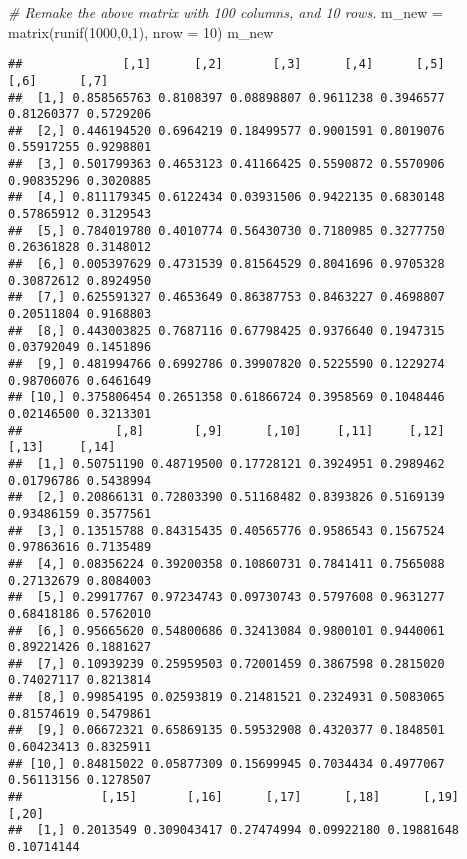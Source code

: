 \documentclass[
]{article}
\newenvironment{Shaded}{\begin{snugshade}}{\end{snugshade}}
\newcommand{\AttributeTok}[1]{\textcolor[rgb]{0.77,0.63,0.00}{#1}}
\newcommand{\CommentTok}[1]{\textcolor[rgb]{0.56,0.35,0.01}{\textit{#1}}}
\newcommand{\DecValTok}[1]{\textcolor[rgb]{0.00,0.00,0.81}{#1}}
\newcommand{\FunctionTok}[1]{\textcolor[rgb]{0.00,0.00,0.00}{#1}}
\newcommand{\NormalTok}[1]{#1}
\newcommand{\OtherTok}[1]{\textcolor[rgb]{0.56,0.35,0.01}{#1}}
\begin{document}
\begin{Shaded}
\begin{Highlighting}[]
\CommentTok{\# Remake the above matrix with 100 columns, and 10 rows.}
\NormalTok{m\_new }\OtherTok{=} \FunctionTok{matrix}\NormalTok{(}\FunctionTok{runif}\NormalTok{(}\DecValTok{1000}\NormalTok{,}\DecValTok{0}\NormalTok{,}\DecValTok{1}\NormalTok{), }\AttributeTok{nrow =} \DecValTok{10}\NormalTok{)}
\NormalTok{m\_new}
\end{Highlighting}
\end{Shaded}

\begin{verbatim}
##              [,1]      [,2]       [,3]      [,4]      [,5]       [,6]      [,7]
##  [1,] 0.858565763 0.8108397 0.08898807 0.9611238 0.3946577 0.81260377 0.5729206
##  [2,] 0.446194520 0.6964219 0.18499577 0.9001591 0.8019076 0.55917255 0.9298801
##  [3,] 0.501799363 0.4653123 0.41166425 0.5590872 0.5570906 0.90835296 0.3020885
##  [4,] 0.811179345 0.6122434 0.03931506 0.9422135 0.6830148 0.57865912 0.3129543
##  [5,] 0.784019780 0.4010774 0.56430730 0.7180985 0.3277750 0.26361828 0.3148012
##  [6,] 0.005397629 0.4731539 0.81564529 0.8041696 0.9705328 0.30872612 0.8924950
##  [7,] 0.625591327 0.4653649 0.86387753 0.8463227 0.4698807 0.20511804 0.9168803
##  [8,] 0.443003825 0.7687116 0.67798425 0.9376640 0.1947315 0.03792049 0.1451896
##  [9,] 0.481994766 0.6992786 0.39907820 0.5225590 0.1229274 0.98706076 0.6461649
## [10,] 0.375806454 0.2651358 0.61866724 0.3958569 0.1048446 0.02146500 0.3213301
##             [,8]       [,9]      [,10]     [,11]     [,12]      [,13]     [,14]
##  [1,] 0.50751190 0.48719500 0.17728121 0.3924951 0.2989462 0.01796786 0.5438994
##  [2,] 0.20866131 0.72803390 0.51168482 0.8393826 0.5169139 0.93486159 0.3577561
##  [3,] 0.13515788 0.84315435 0.40565776 0.9586543 0.1567524 0.97863616 0.7135489
##  [4,] 0.08356224 0.39200358 0.10860731 0.7841411 0.7565088 0.27132679 0.8084003
##  [5,] 0.29917767 0.97234743 0.09730743 0.5797608 0.9631277 0.68418186 0.5762010
##  [6,] 0.95665620 0.54800686 0.32413084 0.9800101 0.9440061 0.89221426 0.1881627
##  [7,] 0.10939239 0.25959503 0.72001459 0.3867598 0.2815020 0.74027117 0.8213814
##  [8,] 0.99854195 0.02593819 0.21481521 0.2324931 0.5083065 0.81574619 0.5479861
##  [9,] 0.06672321 0.65869135 0.59532908 0.4320377 0.1848501 0.60423413 0.8325911
## [10,] 0.84815022 0.05877309 0.15699945 0.7034434 0.4977067 0.56113156 0.1278507
##           [,15]       [,16]      [,17]      [,18]      [,19]      [,20]
##  [1,] 0.2013549 0.309043417 0.27474994 0.09922180 0.19881648 0.10714144

\end{verbatim}
\end{document}

